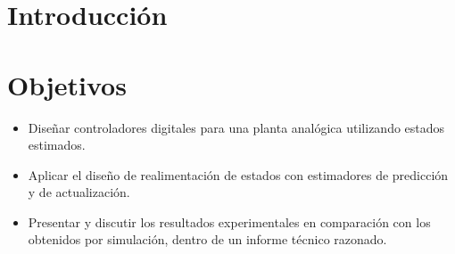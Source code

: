 \section{Introducción}


\section{Objetivos}

\begin{itemize}
	\item Diseñar controladores digitales para una planta analógica utilizando estados estimados.
	\item Aplicar el diseño de realimentación de estados con estimadores de predicción y de actualización.
	\item Presentar y discutir los resultados experimentales en comparación con los obtenidos por simulación, dentro de un informe técnico razonado.
\end{itemize}
